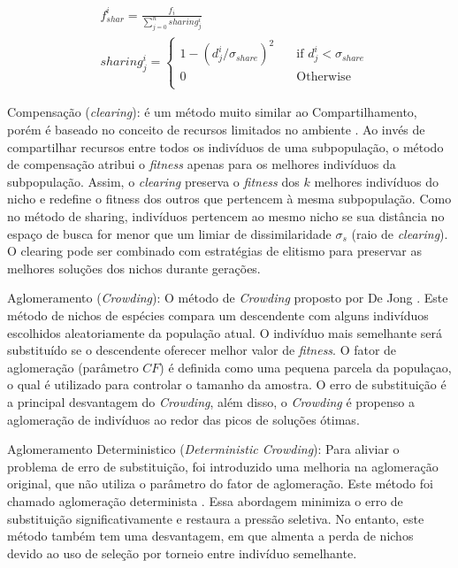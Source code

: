 \begin{equation}
\label{eq:sharing}
\begin{split}
& f_{shar}^i = \frac{f_i}{\sum_{j=0}^{n} sharing_j^i} \\
& sharing_j^i =
	\begin{cases}
	1 - (d_j^i/\sigma_{share})^2 	& \quad \text{if } d_j^i < \sigma_{share}\\
	0 							& \quad \text{Otherwise}\\
	\end{cases} 
\end{split}
\end{equation}

Compensação (\textit{clearing}): é um método muito similar ao Compartilhamento, porém é baseado no conceito de recursos limitados no ambiente \cite{clearing}. Ao invés de compartilhar recursos entre todos os indivíduos de uma subpopulação, o método de compensação atribui o \textit{fitness} apenas para os melhores indivíduos da subpopulação. Assim, o \textit{clearing} preserva o \textit{fitness} dos $k$ melhores indivíduos do nicho e redefine o fitness dos outros que pertencem à mesma subpopulação. Como no método de sharing, indivíduos pertencem ao mesmo nicho se sua distância no espaço de busca for menor
que um limiar de dissimilaridade $\sigma_s$ (raio de \textit{clearing}). O clearing pode ser combinado com estratégias de elitismo para preservar as melhores soluções dos nichos durante gerações.

Aglomeramento (\textit{Crowding}): O método de \textit{Crowding} proposto por De Jong \cite{crowding}. Este método de nichos de espécies compara um descendente com alguns indivíduos escolhidos aleatoriamente da população atual. O indivíduo mais semelhante será substituído se o descendente oferecer melhor valor de \textit{fitness}. O fator de aglomeração (parâmetro $CF$) é definida como uma pequena parcela da populaçao, o qual é utilizado para controlar o tamanho da amostra. O erro de substituição é a principal desvantagem do  \textit{Crowding}, além disso, o \textit{Crowding} é propenso a aglomeração de indivíduos ao redor das picos de soluções ótimas.

Aglomeramento Deterministico (\textit{Deterministic Crowding}): Para aliviar o problema de erro de substituição, foi introduzido uma melhoria na aglomeração original, que não utiliza o parâmetro do fator de aglomeração. Este método foi chamado aglomeração determinista \cite{deterministic_crowding}. Essa abordagem minimiza o erro de substituição significativamente e restaura a pressão seletiva. No entanto, este método também tem uma desvantagem, em que almenta a perda de nichos devido ao uso de seleção por torneio entre indivíduo semelhante.

